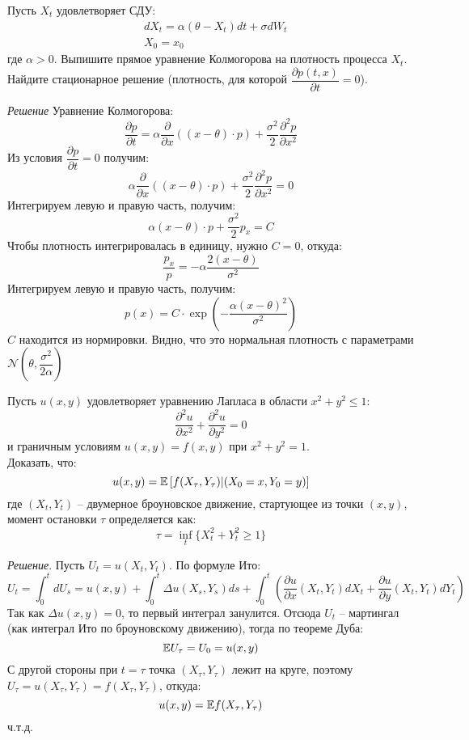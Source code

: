 \documentclass[12pt]{article}
\begin{document}
\begin{problem}
    Пусть $X_t$ удовлетворяет СДУ:
    \begin{align*}
        &dX_t = \alpha (\theta - X_t) dt + \sigma dW_t \\
        &X_0 = x_0
    \end{align*}где $\alpha > 0$.
    Выпишите прямое уравнение Колмогорова на плотность процесса $X_t$. Найдите стационарное решение (плотность, для которой $\dfrac{\partial p(t, x)}{\partial t} = 0$).
\end{problem}
\textit{Решение} Уравнение Колмогорова:
$$
    \dfrac{\partial p}{\partial t} = \alpha \dfrac{\partial}{\partial x} \left( (x-\theta) \cdot p \right) + \dfrac{\sigma^2}{2} \dfrac{\partial^2 p}{\partial x^2}
$$
Из условия $\dfrac{\partial p}{\partial t} = 0$ получим:
$$
    \alpha \dfrac{\partial}{\partial x} \left( (x-\theta) \cdot p \right) + \dfrac{\sigma^2}{2} \dfrac{\partial^2 p}{\partial x^2} = 0
$$Интегрируем левую и правую часть, получим:
$$
    \alpha (x - \theta) \cdot p + \dfrac{\sigma^2}{2} p_x = C
$$Чтобы плотность интегрировалась в единицу, нужно $C=0$, откуда:
$$
    \dfrac{p_x}{p} = -\alpha \dfrac{2 (x - \theta)}{\sigma^2}
$$Интегрируем левую и правую часть, получим:
$$
    p(x) = C \cdot \exp(-\frac{\alpha (x-\theta)^2}{\sigma^2})
$$ $C$ находится из нормировки. Видно, что это нормальная плотность с параметрами 
$\mathcal{N}\left(\theta, \dfrac{\sigma^2}{2\alpha}\right)$

\begin{problem}
    Пусть $u(x, y)$ удовлетворяет уравнению Лапласа в области $x^2+y^2 \leq 1$:
    $$
        \dfrac{\partial^2 u}{\partial x^2} + \dfrac{\partial^2 u}{\partial y^2} = 0 
    $$и граничным условиям $u(x, y) = f(x, y)$ при $x^2+y^2=1$. 
    \\ Доказать, что:
    $$
        u(x, y) = \mathbb{E} \left[f(X_{\tau}, Y_{\tau}) | (X_0 = x, Y_0 = y)\right]
    $$где $(X_t, Y_t)$ -- двумерное броуновское движение, стартующее из точки $(x, y)$, момент остановки $\tau$ определяется как:
    $$
        \tau = \inf_{t} \{ X_t^2 + Y_t^2 \geq 1 \}
    $$
\end{problem}
\textit{Решение}. Пусть $U_t = u(X_t, Y_t)$. По формуле Ито:
$$
    U_t = \int_0^t dU_s = u(x, y) + \int_0^t \Delta u(X_s, Y_s) ds + \int_0^t \left( 
        \dfrac{\partial u}{\partial x}(X_t, Y_t) dX_t + \dfrac{\partial u}{\partial y}(X_t, Y_t) dY_t \right)
$$Так как $\Delta u(x, y) = 0$, то первый интеграл занулится. Отсюда $U_t$ -- мартингал (как интеграл Ито по броуновскому движению), тогда по теореме Дуба:
$$
    \mathbb{E} U_{\tau} = U_0 = u(x, y)
$$С другой стороны при $t=\tau$ точка $(X_{\tau}, Y_{\tau})$ лежит на круге, поэтому $U_{\tau} = u(X_{\tau}, Y_{\tau}) = f(X_{\tau}, Y_{\tau})$, откуда:
$$
    u(x, y) = \mathbb{E} f(X_{\tau}, Y_{\tau})
$$ч.т.д.
\end{document}
